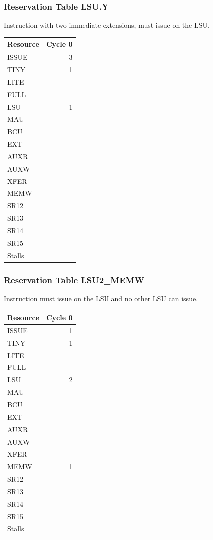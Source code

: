 \subsubsection{Reservation Table LSU.Y} \label{sec:reservation-LSU.Y}

Instruction with two immediate extensions, must issue on the LSU.
\medskip

\begin{tabular}{|l|r|} \hline
Resource	& Cycle 0 \\ \hline
\textsf{ISSUE}	& 3	\\
\textsf{TINY}	& 1	\\
\textsf{LITE}	& 	\\
\textsf{FULL}	& 	\\
\textsf{LSU}	& 1	\\
\textsf{MAU}	& 	\\
\textsf{BCU}	& 	\\
\textsf{EXT}	& 	\\
\textsf{AUXR}	& 	\\
\textsf{AUXW}	& 	\\
\textsf{XFER}	& 	\\
\textsf{MEMW}	& 	\\
\textsf{SR12}	& 	\\
\textsf{SR13}	& 	\\
\textsf{SR14}	& 	\\
\textsf{SR15}	& 	\\
\hline Stalls	& 	\\
\hline \end{tabular}

\subsubsection{Reservation Table LSU2\_MEMW} \label{sec:reservation-LSU2-MEMW}

Instruction must issue on the LSU and no other LSU can issue.
\medskip

\begin{tabular}{|l|r|} \hline
Resource	& Cycle 0 \\ \hline
\textsf{ISSUE}	& 1	\\
\textsf{TINY}	& 1	\\
\textsf{LITE}	& 	\\
\textsf{FULL}	& 	\\
\textsf{LSU}	& 2	\\
\textsf{MAU}	& 	\\
\textsf{BCU}	& 	\\
\textsf{EXT}	& 	\\
\textsf{AUXR}	& 	\\
\textsf{AUXW}	& 	\\
\textsf{XFER}	& 	\\
\textsf{MEMW}	& 1	\\
\textsf{SR12}	& 	\\
\textsf{SR13}	& 	\\
\textsf{SR14}	& 	\\
\textsf{SR15}	& 	\\
\hline Stalls	& 	\\
\hline \end{tabular}

